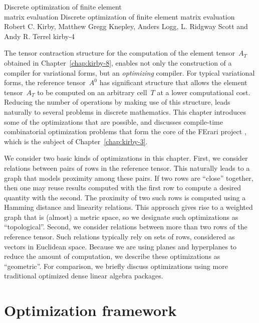               {Discrete optimization of finite element \\ matrix evaluation}
              {Discrete optimization of finite element matrix evaluation}
              {Robert C. Kirby, Matthew Gregg Knepley, Anders Logg, L. Ridgway Scott and Andy R. Terrel}
              {kirby-4}

The tensor contraction structure for the computation of the element
tensor~$A_T$ obtained in Chapter~\ref{chap:kirby-8}, enables not only the
construction of a compiler for variational forms, but an \emph{optimizing}
compiler. For typical variational forms, the reference tensor~$A^0$ has
significant structure that allows the element tensor~$A_T$ to be computed
on an arbitrary cell~$T$ at a lower computational cost. Reducing the
number of operations by making use of this structure, leads naturally
to several problems in discrete mathematics. This chapter introduces
some of the optimizations that are possible, and discusses compile-time
combinatorial optimization problems that form the core of the FErari
project \citep{KirbyLoggScottEtAl2006,KirbyScott2007,KirbyLogg2008},
which is the subject of Chapter~\ref{chap:kirby-3}.

We consider two basic kinds of optimizations in this chapter. First,
we consider relations between pairs of rows in the reference tensor.
This naturally leads to a graph that models proximity among these pairs.
If two rows are ``close'' together, then one may reuse results computed
with the first row to compute a desired quantity with the second.
The proximity of two such rows is computed using a Hamming distance
and linearity relations. This approach gives rise to a weighted graph
that is (almost) a metric space, so we designate such optimizations
as ``topological''.  Second, we consider relations between more than
two rows of the reference tensor. Such relations typically rely on
sets of rows, considered as vectors in Euclidean space. Because we
are using planes and hyperplanes to reduce the amount of computation,
we describe these optimizations as ``geometric''. For comparison, we
briefly discuss optimizations using more traditional optimized dense
linear algebra packages.

\section{Optimization framework}

